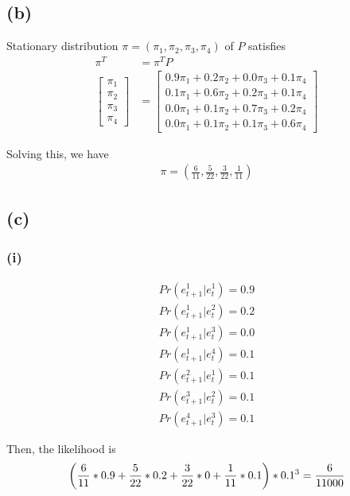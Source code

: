 \documentclass{ltjsarticle}
\begin{document}
\subsection*{(b)}
Stationary distribution $\pi = (\pi_1,\pi_2,\pi_3,\pi_4)$ of $P$ satisfies
\begin{align*}
    \pi^T &= \pi^T P\\
    \begin{bmatrix}\pi_1\\\pi_2\\\pi_3\\\pi_4\end{bmatrix}
        &=\begin{bmatrix}
            0.9\pi_1 + 0.2\pi_2 + 0.0\pi_3 + 0.1\pi_4 \\
            0.1\pi_1 + 0.6\pi_2 + 0.2\pi_3 + 0.1\pi_4 \\
            0.0\pi_1 + 0.1\pi_2 + 0.7\pi_3 + 0.2\pi_4 \\
            0.0\pi_1 + 0.1\pi_2 + 0.1\pi_3 + 0.6\pi_4
            \end{bmatrix}
\end{align*}

Solving this, we have 
\begin{align*}
    \pi = (\frac{6}{11},  \frac{5}{22},  \frac{3}{22}, \frac{1}{11})
\end{align*}


\subsection*{(c)}
\subsubsection*{(i)}

\begin{align*}
    Pr(e^1_{t+1}|e^1_{t})=0.9\\
    Pr(e^1_{t+1}|e^2_{t})=0.2\\
    Pr(e^1_{t+1}|e^3_{t})=0.0\\
    Pr(e^1_{t+1}|e^4_{t})=0.1\\
    Pr(e^2_{t+1}|e^1_{t})=0.1\\
    Pr(e^3_{t+1}|e^2_{t})=0.1\\
    Pr(e^4_{t+1}|e^3_{t})=0.1
\end{align*}

Then, the likelihood is 
\begin{align*}
    \qty(\frac{6}{11}*0.9+\frac{5}{22}*0.2+\frac{3}{22}*0+\frac{1}{11}*0.1)*0.1^3=\frac{6}{11000}
\end{align*}
\end{document}
